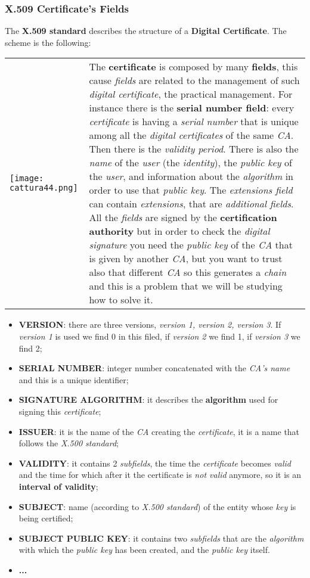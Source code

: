 \documentclass{article}
\begin{document}
\subsubsection{X.509 Certificate's Fields}
The \textbf{X.509 standard} describes the structure of a \textbf{Digital Certificate}. The scheme is the following:\\
\begin{tabular}{C{6cm}  L{9cm}}
\texttt{[image: cattura44.png]} 
& The \textbf{certificate} is composed by many \textbf{fields}, this cause \emph{fields} are related to the management of such \emph{digital certificate}, the practical management. For instance there is the \textbf{serial number field}: every \emph{certificate} is having a \emph{serial number} that is unique among all the \emph{digital certificates} of the same \emph{CA}. Then there is the \emph{validity period}. There is also the \emph{name} of the \emph{user} (the \emph{identity}), the \emph{public key} of the \emph{user}, and information about the \emph{algorithm} in order to use that \emph{public key}. The \emph{extensions field} can contain \emph{extensions}, that are \emph{additional fields}. All the \emph{fields} are signed by the \textbf{certification authority} but in order to check the \emph{digital signature} you need the \emph{public key} of the \emph{CA} that is given by another \emph{CA}, but you want to trust also that different \emph{CA} so this generates a \emph{chain} and this is a problem that we will be studying how to solve it.
\end{tabular}
\begin{itemize}
\item \textbf{VERSION}: there are three versions, \emph{version 1, version 2, version 3}. If \emph{version 1} is used we find 0 in this filed, if \emph{version 2} we find 1, if \emph{version 3} we find 2;
\item \textbf{SERIAL NUMBER}: integer number concatenated with the \emph{CA’s name} and this is a unique identifier;
\item \textbf{SIGNATURE ALGORITHM}: it describes the \textbf{algorithm} used for signing this \emph{certificate};
\item \textbf{ISSUER}: it is the name of the \emph{CA} creating the \emph{certificate}, it is a name that follows the\emph{ X.500 standard};
\item \textbf{VALIDITY}: it contains 2 \emph{subfields}, the time the \emph{certificate} becomes \emph{valid} and the time for which after it the certificate is \emph{not valid} anymore, so it is an \textbf{interval of validity};
\item \textbf{SUBJECT}: name (according to \emph{X.500 standard}) of the entity whose \emph{key} is being certified;
\item \textbf{SUBJECT PUBLIC KEY}: it contains two \emph{subfields} that are the \emph{algorithm} with which the \emph{public key} has been created, and the\emph{ public key }itself.
\item \textbf{...}
\end{itemize}
\clearpage
\end{document}

